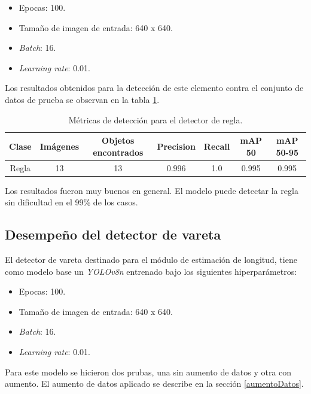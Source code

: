 \begin{itemize}
	\item Epocas: 100.
    \item Tamaño de imagen de entrada: 640 x 640.
    \item \textit{Batch}: 16.
    \item \textit{Learning rate}: 0.01.
\end{itemize}

Los resultados obtenidos para la detección de este elemento contra el conjunto de datos de prueba se observan en la tabla \ref{tab:resultadosRegla}.

\begin{table}[h]
	\centering
	\caption{Métricas de detección para el detector de regla.}
	\begin{tabular}{c c c c c c c}    
		\toprule
		\textbf{Clase}&\textbf{Imágenes}&\textbf{Objetos encontrados}&\textbf{Precision} &\textbf{Recall}&\textbf{mAP 50}&\textbf{mAP 50-95}\\
		\midrule
		Regla & 13 & 13 & 0.996 & 1.0 & 0.995 & 0.995\\		
		\bottomrule
		\hline
	\end{tabular}
	\label{tab:resultadosRegla}
\end{table}

Los resultados fueron muy buenos en general. El modelo puede detectar la regla sin dificultad en el 99\% de los casos.

\subsection{Desempeño del detector de vareta}

El detector de vareta destinado para el módulo de estimación de longitud, tiene como modelo base un \textit{YOLOv8n} entrenado bajo los siguientes hiperparámetros:

\begin{itemize}
	\item Epocas: 100.
    \item Tamaño de imagen de entrada: 640 x 640.
    \item \textit{Batch}: 16.
    \item \textit{Learning rate}: 0.01.
\end{itemize}

Para este modelo se hicieron dos prubas, una sin aumento de datos y otra con aumento. El aumento de datos aplicado se describe en la sección \ref{aumentoDatos}.

